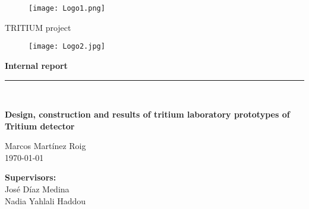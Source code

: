 \begin{titlepage}

\begin{center}
\vspace*{-1in}
\vspace*{1 cm}
\begin{figure}[htb]
\begin{center}
\texttt{[image: Logo1.png]}
\end{center}
\end{figure}
\vspace*{2 cm}


{\huge TRITIUM project}\\
\vspace*{0.2in}
\vspace*{0.6in}
\end{center}
\vspace*{-1in}
\begin{center}
\vspace*{0.25 cm}


\begin{figure}[htb]
\begin{center}
\texttt{[image: Logo2.jpg]} 
\end{center}
\end{figure}
\vspace*{1 cm}

\begin{large}
\textbf{{\large Internal report}}\\
\rule{80mm}{0.1mm}\\

\end{large}
\vspace*{0.2in}
\begin{Large}
\textbf{\LARGE Design, construction and results of tritium laboratory prototypes of Tritium detector} \\
\end{Large}
\vspace*{1 cm}

\begin{large}
Marcos Martínez Roig\\
\today
\end{large}
\end{center}

\begin{large}
\begin{flushright}
\item[\bf Supervisors:\hspace{4cm} ]\quad  \\ José Díaz Medina\\
Nadia Yahlali Haddou\\
\end{flushright}
\end{large}

\end{titlepage}
